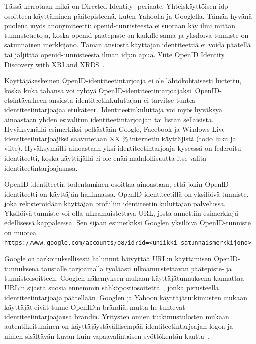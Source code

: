 \documentclass[finnish,gradu]{tktltiki}
\begin{document}
  Tässä kerrotaan mikä on Directed Identity -periaate. Yhteiskäyttöisen idp-osoitteen käyttäminen päätepisteenä, kuten Yahoolla ja Googlella. Tämän hyvänä puolena myös anonymiteetti: openid-tunnisteesta ei suoraan käy ilmi mitään tunnistetietoja, koska openid-päätepiste on kaikille sama ja yksilöivä tunniste on satunnainen merkkijono. Tämän ansiosta käyttäjän identiteettiä ei voida päätellä tai jäljittää openid-tunnisteesta ilman idp:n apua.
  Viite OpenID Identity Discovery with XRI and XRDS~\cite{openid_discovery_recordon_2008}.

  Käyttäjäkeskeinen OpenID-identiteetintarjoaja ei ole lähtökohtaisesti luotettu, koska kuka tahansa voi ryhtyä OpenID-identiteetintarjoajaksi. OpenID-etsintävaiheen ansiosta identiteetinkuluttajan ei tarvitse tuntea identiteetintarjoajaa etukäteen. Identiteetinkuluttaja voi myös hyväksyä ainoastaan yhden esivalitun identiteetintarjoajan tai listan sellaisista. Hyväksymällä esimerkiksi pelkästään Google, Facebook ja Windows Live identiteetintarjoajiksi saavutetaan XX \% internetin käyttäjistä (todo luku ja viite). Hyväksymällä ainoastaan yksi identiteetintarjoaja kyseessä on federoitu identiteetti, koska käyttäjällä ei ole enää mahdollisuutta itse valita identiteetintarjoajaansa.

   OpenID-identiteetin todentaminen osoittaa ainoastaan, että jokin OpenID-identiteetti on käyttäjän hallinnassa. OpenID-identiteetillä on yksilöivä tunniste, joka rekisteröidään käyttäjän profiiliin identiteetin kuluttajan palvelussa. Yksilöivä tunniste voi olla ulkoamuistettava URL, josta annettiin esimerkkejä edellisessä kappaleessa. Sen sijaan esimerkiksi Googlen yksilöivä OpenID-tunniste on muotoa
  \\ \verb#https://www.google.com/accounts/o8/id?id=<uniikki satunnaismerkkijono>#

  Google on tarkoituksellisesti halunnut häivyttää URL:n käyttämisen OpenID-tunnuksena taustalle tarjoamalla työläästi ulkoamuistettavan päätepiste- ja tunnisteosoitteen. Googlen näkemyksen mukaan käyttäjätunnuksena kannattaa URL:n sijasta suosia ennemmin sähköpostiosoitetta~\cite{google_best_practices_authentication}, jonka perusteella identiteetintarjoaja päätellään. Googlen ja Yahoon käyttäjätutkimusten mukaan käyttäjät eivät tunne OpenID:n brändiä, mutta he tuntevat identiteetintarjoajansa brändin. Yritysten omien tutkimustulosten mukaan autentikoituminen on käyttäjäystävällisempää identiteetintarjoajan logon ja nimen sisältävän kuvan kuin vapaavalintaisen syöttökentän kautta~\cite{google_usability_federated_login, yahoo_usability_openid_2008, google_thoughts_combining_ux_2008a}.
\end{document}
